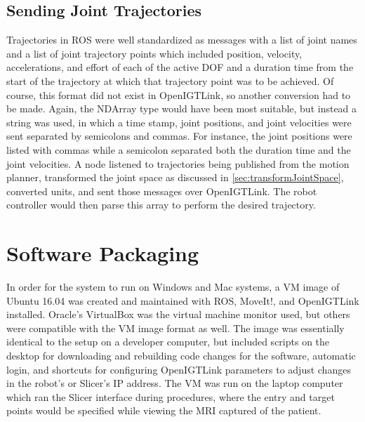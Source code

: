 \documentclass[12pt]{report}
\makeatletter
\renewcommand{\todo}[2][]{%
    \@todo[caption={#2}, #1]{\begin{spacing}{0.5}#2\end{spacing}}%
}
\makeatother
\begin{document}
\subsection{Sending Joint Trajectories}
\label{sec:sendJointTrajectories}
Trajectories in ROS were well standardized as messages with a list of joint names and a list of joint trajectory points which included position, velocity, accelerations, and effort of each of the active DOF and a duration time from the start of the trajectory at which that trajectory point was to be achieved. Of course, this format did not exist in OpenIGTLink, so another conversion had to be made. Again, the NDArray type would have been most suitable, but instead a string was used, in which a time stamp, joint positions, and joint velocities were sent separated by semicolons and commas. For instance, the joint positions were listed with commas while a semicolon separated both the duration time and the joint velocities. A node listened to trajectories being published from the motion planner, transformed the joint space as discussed in \autoref{sec:transformJointSpace}, converted units, and sent those messages over OpenIGTLink. The robot controller would then parse this array to perform the desired trajectory.



\section{Software Packaging}
In order for the system to run on Windows and Mac systems, a VM image of Ubuntu 16.04 was created and maintained with ROS, MoveIt!, and OpenIGTLink installed. Oracle's VirtualBox was the virtual machine monitor used, but others were compatible with the VM image format as well. The image was essentially identical to the setup on a developer computer, but included scripts on the desktop for downloading and rebuilding code changes for the software, automatic login, and shortcuts for configuring OpenIGTLink parameters to adjust changes in the robot's or Slicer's IP address. The VM was run on the laptop computer which ran the Slicer interface during procedures, where the entry and target points would be specified while viewing the MRI captured of the patient.
\end{document}
